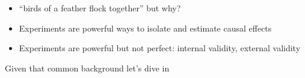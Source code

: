 \documentclass[aspectratio=169]{beamer}
\begin{document}
\begin{frame}

\begin{itemize}
\item ``birds of a feather flock together'' but why? 
\item Experiments are powerful ways to isolate and estimate causal effects
\item Experiments are powerful but not perfect: internal validity, external validity
\end{itemize}

\vfill
Given that common background let's dive in

\end{frame}
\end{document}
